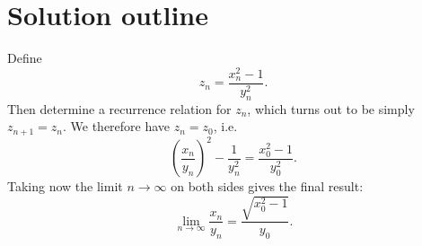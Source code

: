 \documentclass[12pt,oneside,a4paper]{article}
\begin{document}
\section{Solution outline}
Define
\begin{equation*}
    z_n = \frac{x_n^2-1}{y_n^2}.
\end{equation*}
Then determine a recurrence relation for $z_n$, which turns out to be simply
$z_{n+1} = z_n$.
%
We therefore have $z_n = z_0$, i.e.
\begin{equation*}
    \left(\frac{x_n}{y_n}\right)^2 - \frac{1}{y_n^2} = \frac{x_0^2-1}{y_0^2}.
\end{equation*}
%
Taking now the limit $n\rightarrow\infty$ on both sides gives the final result:
\begin{equation*}
    \lim_{n\rightarrow\infty} \frac{x_n}{y_n} = \frac{\sqrt{x_0^2-1}}{y_0}.
\end{equation*}
\end{document}

